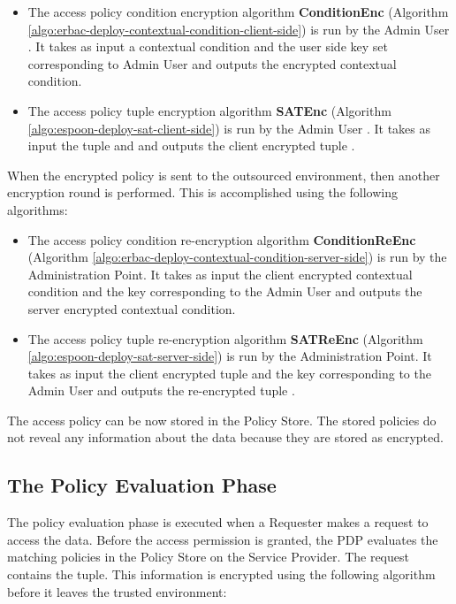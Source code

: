 \documentclass[epsfig,a4paper,11pt,titlepage]{book}
\numberwithin{algorithm}{chapter}
\begin{document}
\begin{itemize}

\item The access policy condition encryption algorithm \textbf{ConditionEnc} (Algorithm \ref{algo:erbac-deploy-contextual-condition-client-side}) is run by the Admin User . It takes as input a contextual condition and the user side key set  corresponding to Admin User  and outputs the encrypted contextual condition.

\item The access policy  tuple encryption algorithm \textbf{SATEnc} (Algorithm \ref{algo:espoon-deploy-sat-client-side}) is run by the Admin User . It takes as input the  tuple and  and outputs the client encrypted tuple .

\end{itemize}

When the encrypted policy is sent to the outsourced environment, then another encryption round is performed. This is accomplished using the following algorithms:

\begin{itemize}

\item The access policy condition re-encryption algorithm \textbf{ConditionReEnc} (Algorithm \ref{algo:erbac-deploy-contextual-condition-server-side}) is run by the Administration Point. It takes as input the client encrypted contextual condition and the key  corresponding to the Admin User  and outputs the server encrypted contextual condition.

\item The access policy  tuple re-encryption algorithm \textbf{SATReEnc} (Algorithm \ref{algo:espoon-deploy-sat-server-side}) is run by the Administration Point. It takes as input the client encrypted tuple  and the key  corresponding to the Admin User  and outputs the re-encrypted tuple .

\end{itemize}

The access policy can be now stored in the Policy Store. The stored policies do not reveal any information about the data because they are stored as encrypted.

\subsection{The Policy Evaluation Phase}
The policy evaluation phase is executed when a Requester makes a request to access the data. Before the access permission is granted, the \gls{PDP} evaluates the matching policies in the Policy Store on the Service Provider. The request contains the  tuple. This information is encrypted using the following algorithm before it leaves the trusted environment:
\end{document}
